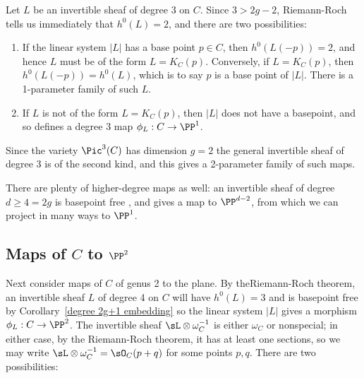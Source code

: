  Let $L$ be an invertible sheaf of degree 3 on $C$. Since $3 > 2g-2$, Riemann-Roch tells us immediately that $h^0(L) = 2$, and there are two possibilities:

\begin{enumerate}
\item If the linear system $|L|$ has a base point $p \in C$, then $h^0(L(-p)) = 2$, and hence $L$ must be of the form $L = K_C(p)$. Conversely, if $L = K_C(p)$, then $h^0(L(-p)) = h^0(L)$, which is to say $p$ is a base point of $|L|$. There is a 1-parameter family of such $L$.

\item If $L$ is not of the form $L = K_C(p)$, then $|L|$ does not have a basepoint, and so defines a degree 3 map $\phi_L : C \to \PP^1$.
\end{enumerate}

Since the variety $\Pic^3(C)$ has dimension $g= 2$ the general invertible sheaf of degree 3 is of the second kind, and this gives a 2-parameter family of such maps.

There are plenty of higher-degree maps as well: an invertible sheaf of degree $d \geq 4 = 2g$ is basepoint free
, and gives a map to $\PP^{d-2}$, from which we can project in many ways
to $\PP^1$.

\subsection{Maps of $C$ to $\PP^2$} 
Next consider maps of $C$ of genus 2 to the plane. By theRiemann-Roch theorem, an invertible sheaf $L$ of degree 4 on $C$ will have $h^0(L) = 3$ and is basepoint free by Corollary~\ref{degree 2g+1 embedding} so the linear system $|L|$  gives a morphism $\phi_L : C \to \PP^2$. The invertible sheaf $\sL\otimes \omega_C^{-1}$ is either
$\omega_C$ or nonspecial; in either case, by the Riemann-Roch theorem, it has at least one sections, 
so we may write $\sL\otimes \omega_C^{-1} = \sO_C(p+q)$ for some points $p,q$. There are two possibilities:

